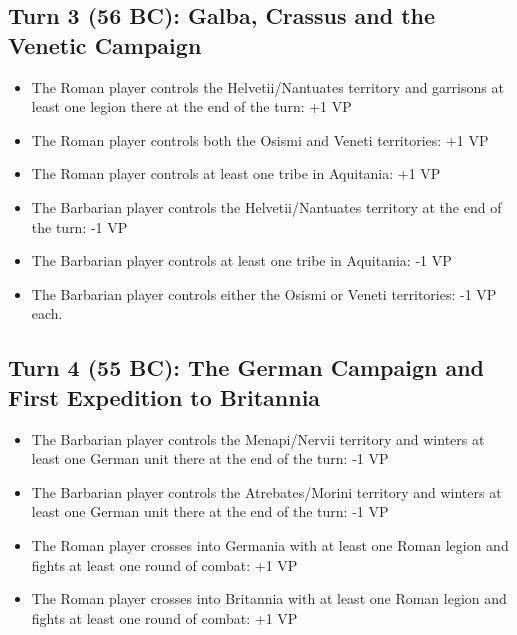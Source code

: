 \subsection{Turn 3 (56 BC): Galba, Crassus and the Venetic Campaign}
\begin{itemize}
  \setlength\itemsep{0em}
  \item The Roman player controls the Helvetii/Nantuates territory and garrisons at least one legion there at the end of the turn: +1 VP
  \item The Roman player controls both the Osismi and Veneti territories: +1 VP
  \item The Roman player controls at least one tribe in Aquitania: +1 VP
  \item The Barbarian player controls the Helvetii/Nantuates territory at the end of the turn: -1 VP
  \item The Barbarian player controls at least one tribe in Aquitania: -1 VP
  \item The Barbarian player controls either the Osismi or Veneti territories: -1 VP each.
\end{itemize}

\subsection{Turn 4 (55 BC): The German Campaign and First Expedition to Britannia}
\begin{itemize}
  \setlength\itemsep{0em}
  \item The Barbarian player controls the Menapi/Nervii territory and winters at least one German unit there at the end of the turn: -1 VP
  \item The Barbarian player controls the Atrebates/Morini territory and winters at least one German unit there at the end of the turn: -1 VP
  \item The Roman player crosses into Germania with at least one Roman legion and fights at least one round of combat: +1 VP
  \item The Roman player crosses into Britannia with at least one Roman legion and fights at least one round of combat: +1 VP
\end{itemize}

